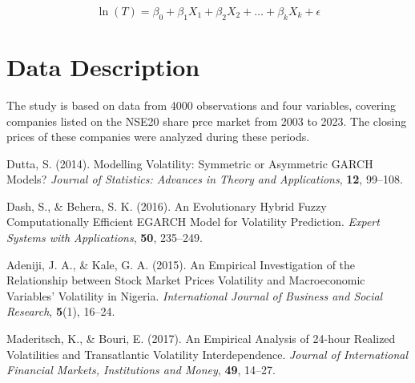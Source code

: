 \documentclass[twoside,a4paper,12pt]{article}
\begin{document}
\begin{equation}	
		\ln(T) = \beta_0 + \beta_1 X_1 + \beta_2 X_2 + \dots + \beta_k X_k + \epsilon \label{eq:1} 	
\end{equation}



 

\section*{Data Description}
The study is based on data from 4000 observations and four variables, covering companies listed on the NSE20 share prce market from 2003 to 2023. The closing prices of these companies were analyzed during these periods.
\begin{thebibliography}{9}

Dutta, S. (2014). Modelling Volatility: Symmetric or Asymmetric GARCH Models?
\textit{Journal of Statistics: Advances in Theory and Applications}, \textbf{12}, 99--108.

Dash, S., \& Behera, S. K. (2016). An Evolutionary Hybrid Fuzzy Computationally Efficient EGARCH Model for Volatility Prediction.
\textit{Expert Systems with Applications}, \textbf{50}, 235--249.

Adeniji, J. A., \& Kale, G. A. (2015). An Empirical Investigation of the Relationship between Stock Market Prices Volatility and Macroeconomic Variables’ Volatility in Nigeria.
\textit{International Journal of Business and Social Research}, \textbf{5}(1), 16--24.

Maderitsch, K., \& Bouri, E. (2017). An Empirical Analysis of 24-hour Realized Volatilities and Transatlantic Volatility Interdependence.
\textit{Journal of International Financial Markets, Institutions and Money}, \textbf{49}, 14--27.

\end{thebibliography}
\end{document}
